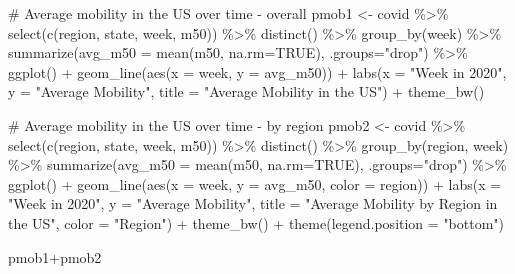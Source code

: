 \documentclass[
  letterpaper,
]{latex/krantz}
\makeatletter
\newenvironment{Shaded}{\begin{snugshade}}{\end{snugshade}}
\newcommand{\AttributeTok}[1]{\textcolor[rgb]{0.40,0.45,0.13}{#1}}
\newcommand{\CommentTok}[1]{\textcolor[rgb]{0.37,0.37,0.37}{#1}}
\newcommand{\ConstantTok}[1]{\textcolor[rgb]{0.56,0.35,0.01}{#1}}
\newcommand{\FunctionTok}[1]{\textcolor[rgb]{0.28,0.35,0.67}{#1}}
\newcommand{\NormalTok}[1]{\textcolor[rgb]{0.00,0.23,0.31}{#1}}
\newcommand{\OtherTok}[1]{\textcolor[rgb]{0.00,0.23,0.31}{#1}}
\newcommand{\SpecialCharTok}[1]{\textcolor[rgb]{0.37,0.37,0.37}{#1}}
\newcommand{\StringTok}[1]{\textcolor[rgb]{0.13,0.47,0.30}{#1}}
\newenvironment{kframe}{%
\medskip{}
\setlength{\fboxsep}{.8em}
 \def\at@end@of@kframe{}%
 \ifinner\ifhmode%
  \def\at@end@of@kframe{\end{minipage}}%
  \begin{minipage}{\columnwidth}%
 \fi\fi%
 \def\FrameCommand##1{\hskip\@totalleftmargin \hskip-\fboxsep
 \colorbox{shadecolor}{##1}\hskip-\fboxsep
     \hskip-\linewidth \hskip-\@totalleftmargin \hskip\columnwidth}%
 \MakeFramed {\advance\hsize-\width
   \@totalleftmargin\z@ \linewidth\hsize
   \@setminipage}}%
 {\par\unskip\endMakeFramed%
 \at@end@of@kframe}
\renewenvironment{Shaded}{\begin{kframe}}{\end{kframe}}
\makeatother
\begin{document}
\begin{Shaded}
\begin{Highlighting}[]
\CommentTok{\# Average mobility in the US over time {-} overall }
\NormalTok{pmob1 }\OtherTok{\textless{}{-}}\NormalTok{ covid }\SpecialCharTok{\%\textgreater{}\%}
  \FunctionTok{select}\NormalTok{(}\FunctionTok{c}\NormalTok{(region, state, week, m50)) }\SpecialCharTok{\%\textgreater{}\%}
  \FunctionTok{distinct}\NormalTok{() }\SpecialCharTok{\%\textgreater{}\%}
  \FunctionTok{group\_by}\NormalTok{(week) }\SpecialCharTok{\%\textgreater{}\%}
  \FunctionTok{summarize}\NormalTok{(}\AttributeTok{avg\_m50 =} \FunctionTok{mean}\NormalTok{(m50, }\AttributeTok{na.rm=}\ConstantTok{TRUE}\NormalTok{), }\AttributeTok{.groups=}\StringTok{"drop"}\NormalTok{) }\SpecialCharTok{\%\textgreater{}\%}
  \FunctionTok{ggplot}\NormalTok{() }\SpecialCharTok{+} 
  \FunctionTok{geom\_line}\NormalTok{(}\FunctionTok{aes}\NormalTok{(}\AttributeTok{x =}\NormalTok{ week, }\AttributeTok{y =}\NormalTok{ avg\_m50)) }\SpecialCharTok{+}
  \FunctionTok{labs}\NormalTok{(}\AttributeTok{x =} \StringTok{"Week in 2020"}\NormalTok{, }\AttributeTok{y =} \StringTok{"Average Mobility"}\NormalTok{, }
       \AttributeTok{title =} \StringTok{"Average Mobility in the US"}\NormalTok{) }\SpecialCharTok{+} 
  \FunctionTok{theme\_bw}\NormalTok{()}

\CommentTok{\# Average mobility in the US over time {-} by region}
\NormalTok{pmob2 }\OtherTok{\textless{}{-}}\NormalTok{ covid }\SpecialCharTok{\%\textgreater{}\%}
  \FunctionTok{select}\NormalTok{(}\FunctionTok{c}\NormalTok{(region, state, week, m50)) }\SpecialCharTok{\%\textgreater{}\%}
  \FunctionTok{distinct}\NormalTok{() }\SpecialCharTok{\%\textgreater{}\%}
  \FunctionTok{group\_by}\NormalTok{(region, week) }\SpecialCharTok{\%\textgreater{}\%}
  \FunctionTok{summarize}\NormalTok{(}\AttributeTok{avg\_m50 =} \FunctionTok{mean}\NormalTok{(m50, }\AttributeTok{na.rm=}\ConstantTok{TRUE}\NormalTok{), }\AttributeTok{.groups=}\StringTok{"drop"}\NormalTok{) }\SpecialCharTok{\%\textgreater{}\%}
  \FunctionTok{ggplot}\NormalTok{() }\SpecialCharTok{+} 
  \FunctionTok{geom\_line}\NormalTok{(}\FunctionTok{aes}\NormalTok{(}\AttributeTok{x =}\NormalTok{ week, }\AttributeTok{y =}\NormalTok{ avg\_m50, }\AttributeTok{color =}\NormalTok{ region)) }\SpecialCharTok{+}
  \FunctionTok{labs}\NormalTok{(}\AttributeTok{x =} \StringTok{"Week in 2020"}\NormalTok{, }\AttributeTok{y =} \StringTok{"Average Mobility"}\NormalTok{, }
       \AttributeTok{title =} \StringTok{"Average Mobility by Region in the US"}\NormalTok{,}
       \AttributeTok{color =} \StringTok{"Region"}\NormalTok{) }\SpecialCharTok{+} 
  \FunctionTok{theme\_bw}\NormalTok{() }\SpecialCharTok{+}
  \FunctionTok{theme}\NormalTok{(}\AttributeTok{legend.position =} \StringTok{"bottom"}\NormalTok{) }

\NormalTok{pmob1}\SpecialCharTok{+}\NormalTok{pmob2}
\end{Highlighting}
\end{Shaded}
\end{document}
